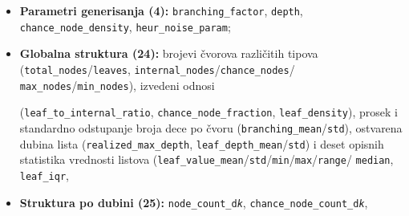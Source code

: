 \documentclass[12pt, a4paper]{article}
\begin{document}
\begin{itemize}[noitemsep]
    \item \textbf{Parametri generisanja (4):} \texttt{branching\_factor}, \texttt{depth},
    \texttt{chance\_node\_density}, \texttt{heur\_noise\_param};
    \item \textbf{Globalna struktura (24):} brojevi čvorova različitih tipova
    (\texttt{total\_nodes}/\texttt{leaves}, \texttt{internal\_nodes}/\texttt{chance\_nodes}/%
    \texttt{max\_nodes}/\texttt{min\_nodes}),
    izvedeni odnosi 
    
    (\texttt{leaf\_to\_internal\_ratio}, \texttt{chance\_node\_fraction},
    \texttt{leaf\_density}), prosek i standardno odstupanje broja dece po čvoru
    (\texttt{branching\_mean}/\texttt{std}), ostvarena dubina lista (\texttt{realized\_max\_depth},
    \texttt{leaf\_depth\_mean}/\texttt{std}) i deset opisnih statistika vrednosti listova
    (\texttt{leaf\_value\_mean}/\texttt{std}/\texttt{min}/\texttt{max}/\texttt{range}/%
    \texttt{median}, \texttt{leaf\_iqr},
    \item \textbf{Struktura po dubini (25):} \texttt{node\_count\_d\textit{k}},
    \texttt{chance\_node\_count\_d\textit{k}}, 
    

\end{itemize}
\end{document}
